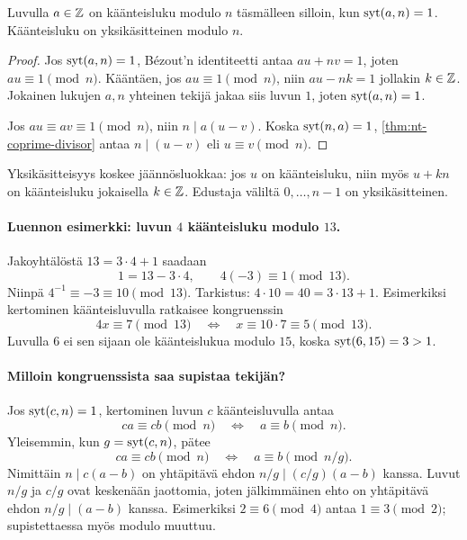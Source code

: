 \documentclass[11pt,a4paper]{amsart}
\begin{document}
\begin{theorem}
  Luvulla $a\in\mathbb{Z}$ on käänteisluku modulo $n$ täsmälleen silloin,
  kun $\operatorname{syt}(a,n)=1$. Käänteisluku on yksikäsitteinen modulo $n$.
\end{theorem}
\begin{proof}
  Jos $\operatorname{syt}(a,n)=1$, Bézout'n identiteetti antaa $au+nv=1$,
  joten $au\equiv1\pmod n$.
  Kääntäen, jos $au\equiv1\pmod n$, niin $au-nk=1$ jollakin
  $k\in\mathbb{Z}$. Jokainen lukujen $a,n$ yhteinen tekijä jakaa siis
  luvun $1$, joten $\operatorname{syt}(a,n)=1$.

  Jos $au\equiv av\equiv1\pmod n$, niin $n\mid a(u-v)$.
  Koska $\operatorname{syt}(n,a)=1$, \cref{thm:nt-coprime-divisor} antaa
  $n\mid(u-v)$ eli $u\equiv v\pmod n$.
\end{proof}
Yksikäsitteisyys koskee jäännösluokkaa: jos $u$ on käänteisluku,
niin myös $u+kn$ on käänteisluku jokaisella $k\in\mathbb{Z}$.
Edustaja väliltä $0,\ldots,n-1$ on yksikäsitteinen.

\paragraph{Luennon esimerkki: luvun $4$ käänteisluku modulo $13$.}
Jakoyhtälöstä $13=3\cdot4+1$ saadaan
\[
  1=13-3\cdot4,\qquad 4(-3)\equiv1\pmod{13}.
\]
Niinpä $4^{-1}\equiv-3\equiv10\pmod{13}$.
Tarkistus: $4\cdot10=40=3\cdot13+1$.
Esimerkiksi kertominen käänteisluvulla ratkaisee kongruenssin
\[
  4x\equiv7\pmod{13}
  \quad\Longleftrightarrow\quad
  x\equiv10\cdot7\equiv5\pmod{13}.
\]
Luvulla $6$ ei sen sijaan ole käänteislukua modulo $15$, koska
$\operatorname{syt}(6,15)=3>1$.

\paragraph{Milloin kongruenssista saa supistaa tekijän?}
Jos $\operatorname{syt}(c,n)=1$, kertominen luvun $c$ käänteisluvulla antaa
\[
  ca\equiv cb\pmod n
  \quad\Longleftrightarrow\quad a\equiv b\pmod n.
\]
Yleisemmin, kun $g=\operatorname{syt}(c,n)$, pätee
\[
  \boxed{ca\equiv cb\pmod n
  \quad\Longleftrightarrow\quad a\equiv b\pmod{n/g}.}
\]
Nimittäin $n\mid c(a-b)$ on yhtäpitävä ehdon
$n/g\mid(c/g)(a-b)$ kanssa. Luvut $n/g$ ja $c/g$ ovat keskenään
jaottomia, joten jälkimmäinen ehto on yhtäpitävä ehdon
$n/g\mid(a-b)$ kanssa. Esimerkiksi $2\equiv6\pmod4$ antaa
$1\equiv3\pmod2$; supistettaessa myös modulo muuttuu.
\end{document}
